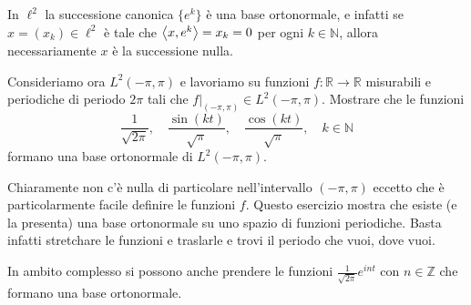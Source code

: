 In \(\ell^2\) la successione canonica \(\{e^{k}\} \) è una base ortonormale, e
infatti se \(x = (x_{k}) \in \ell^2\) è tale che \({\left\langle x, e^{k}\right\rangle} = x_{k} = 0\)
per ogni \(k \in \mathbb{N}\), allora necessariamente \(x\) è la successione
nulla.

\begin{eser}\label{eser:baseL2_periodiche}
    
Consideriamo ora \(L^2{(-\pi, \pi)}\) e lavoriamo su funzioni \(f : \mathbb{R}
\to \mathbb{R}\) misurabili e periodiche di periodo \(2\pi\) tali che
\(f|_{(-\pi, \pi)} \in L^2(- \pi, \pi) \). Mostrare che le funzioni
\[
  \frac{1}{\sqrt{2\pi}}, \quad \frac{\sin{(kt)}}{\sqrt{\pi}}, \quad
  \frac{\cos{(kt)}}{\sqrt{\pi}}, \quad k \in \mathbb{N}
\]
formano una base ortonormale di \(L^2{(-\pi, \pi)}\).
\end{eser}
\begin{remark}
    Chiaramente non c'è nulla di particolare nell'intervallo \((-\pi, \pi)\)
    eccetto che è particolarmente facile definire le funzioni \(f\). Questo
    esercizio mostra che esiste (e la presenta) una base ortonormale su uno
    spazio di funzioni periodiche. Basta infatti stretchare le funzioni e
    traslarle e trovi il periodo che vuoi, dove vuoi.
\end{remark}
\begin{remark}
    In ambito complesso si possono anche prendere le funzioni \(\frac{1}{\sqrt{2\pi}}e^{int}\) con \(n \in
    \mathbb{Z}\) che formano una base ortonormale.
\end{remark}

